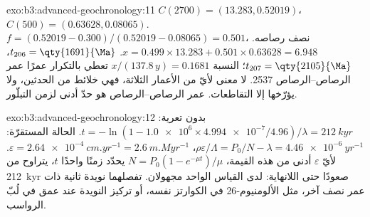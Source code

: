 \begin{solution}{exo:b3:advanced-geochronology:11}
$C(2700) = (13.283, 0.52019)$، $C(500) = (0.63628, 0.08065)$. $f = (0.52019 -
0.300)/(0.52019 - 0.08065) = 0.501$، نصف رصاصه. $x = 0.499\times13.283 +
0.501\times0.63628 = 6.948$. $t_{206} = \qty{1691}{\Ma}$، $t_{207} =
\qty{2105}{\Ma}$؛ النسبة $x/(137.8\,y) = 0.1681$ تعطي بالتكرار عمرًا
عمر الرصاص--الرصاص \qty{2537}{\Ma}. لا معنى لأيّ من الأعمار الثلاثة، فهي
خلائط من الحدثين، ولا يؤرّخها إلا التقاطعات. عمر الرصاص--الرصاص
هو حدّ أدنى لزمن التبلّور.
\end{solution}

\begin{solution}{exo:b3:advanced-geochronology:12}
بدون تعرية: $t = -\ln(1 - \num{1.0e6}\times\num{4.994e-7}/4.96)/\lambda =
\qty{212}{kyr}$. الحالة المستقرّة: $\rho\varepsilon/\Lambda = P_0/N - \lambda =
\qty{4.46e-6}{yr^{-1}}$، $\varepsilon = \qty{2.64e-4}{cm.yr^{-1}} =
\qty{2.6}{m.Myr^{-1}}$. لأيّ $\varepsilon$ أدنى من هذه القيمة، $N =
P_0(1 - e^{-\mu t})/\mu$ يحدّد زمنًا واحدًا $t$، يتراوح من \qty{212}{kyr} صعودًا حتى
اللانهاية: لدى القياس الواحد مجهولان. تفصلهما نويدة ثانية ذات
عمر نصف آخر، مثل الألومنيوم-26 في الكوارتز نفسه، أو تركيز النويدة عند
عمق في لُبّ الرواسب.
\end{solution}

